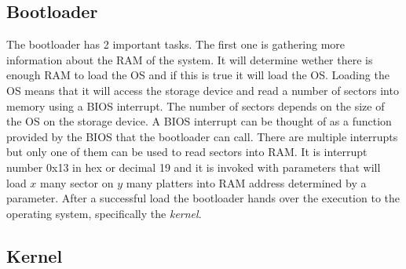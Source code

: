 \subsection{Bootloader}

The bootloader has 2 important tasks. The first one is gathering more
information about the RAM of the system. It will determine wether there is
enough RAM to load the OS and if this is true it will load the OS. Loading
the OS means that it will access the storage device and read a number of
sectors into memory using a BIOS interrupt. The number of sectors depends on
the size of the OS on the storage device. A BIOS interrupt can be thought of
as a function provided by the BIOS that the bootloader can call. There are
multiple interrupts but only one of them can be used to read sectors into
RAM. It is interrupt number 0x13 in hex or decimal 19 and it is invoked with parameters that will load $x$ many sector on $y$ many platters into RAM
address determined by a parameter. After a successful load the bootloader
hands over the execution to the operating system, specifically the \textit{kernel}.

\subsection{Kernel}

